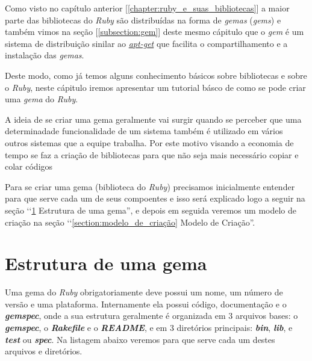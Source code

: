 Como visto no capítulo anterior [\ref{chapter:ruby_e_suas_bibliotecas}] a maior parte das bibliotecas do 
\emph{Ruby} são distribuídas na forma de \emph{gemas} (\emph{gems}) e também vimos na seção 
[\ref{subsection:gem}] deste mesmo cápitulo que o \emph{gem} é um sistema de distribuição sinilar ao 
\emph{\href{https://packages.qa.debian.org/a/apt.html}{apt-get}} que facilita o compartilhamento e a 
instalação das \emph{gemas}. 

Deste modo, como já temos alguns conhecimento básicos sobre bibliotecas e sobre o \emph{Ruby}, neste cápitulo 
iremos apresentar um tutorial básco de como se pode criar uma \emph{gema} do \emph{Ruby}.

A ideia de se criar uma gema geralmente vai surgir quando se perceber que uma determinadade funcionalidade de
um sistema também é utilizado em vários outros sistemas que a equipe trabalha. Por este motivo visando a economia
de tempo se faz a criação de bibliotecas para que não seja mais necessário copiar e colar códigos 

Para se criar uma gema (biblioteca do \emph{Ruby}) precisamos inicialmente entender para que serve cada um
de seus compoentes e isso será explicado logo a seguir na seção 
‘‘\ref{section:estrutura_de_uma_gema} Estrutura de uma gema'', e depois em seguida veremos um modelo de criação 
na seção ‘‘\ref{section:modelo_de_criação} Modelo de Criação''.

\section{Estrutura de uma gema}
\label{section:estrutura_de_uma_gema}

Uma gema do \emph{Ruby} obrigatoriamente deve possui um nome, um número de versão e uma plataforma.
Internamente ela possui código, documentação e o \emph{\textbf{gemspec}}, onde a sua estrutura geralmente é 
organizada em 3 arquivos bases: o \emph{\textbf{gemspec}}, o \emph{\textbf{Rakefile}} e o 
\emph{\textbf{README}}, e em 3 diretórios principais: \emph{\textbf{bin}}, \emph{\textbf{lib}}, e 
\emph{\textbf{test}} ou \emph{\textbf{spec}}. Na listagem abaixo veremos para que serve cada um destes
arquivos e diretórios.

